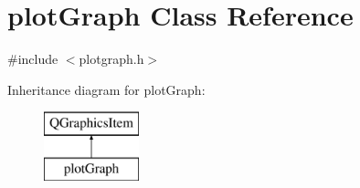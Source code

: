 \hypertarget{classplotGraph}{\section{plot\-Graph Class Reference}
\label{classplotGraph}
}


{\ttfamily \#include $<$plotgraph.\-h$>$}

Inheritance diagram for plot\-Graph\-:\begin{figure}[H]
\begin{center}
\leavevmode
\includegraphics[height=2.000000cm]{classplotGraph}
\end{center}
\end{figure}
